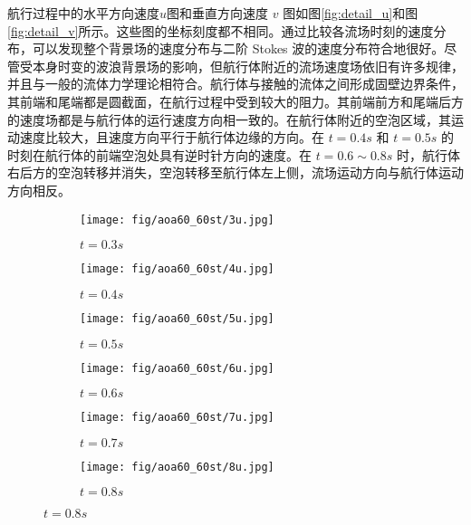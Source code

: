 航行过程中的水平方向速度$u$图和垂直方向速度 $v$ 图如图\ref{fig:detail_u}和图\ref{fig:detail_v}所示。这些图的坐标刻度都不相同。通过比较各流场时刻的速度分布，可以发现整个背景场的速度分布与二阶 Stokes 波的速度分布符合地很好。尽管受本身时变的波浪背景场的影响，但航行体附近的流场速度场依旧有许多规律，并且与一般的流体力学理论相符合。航行体与接触的流体之间形成固壁边界条件，其前端和尾端都是圆截面，在航行过程中受到较大的阻力。其前端前方和尾端后方的速度场都是与航行体的运行速度方向相一致的。在航行体附近的空泡区域，其运动速度比较大，且速度方向平行于航行体边缘的方向。在 $t = 0.4s$ 和 $t = 0.5s$ 的时刻在航行体的前端空泡处具有逆时针方向的速度。在 $t = 0.6 \sim 0.8 s$ 时，航行体右后方的空泡转移并消失，空泡转移至航行体左上侧，流场运动方向与航行体运动方向相反。 


\begin{figure}[!htp]
  \centering

  \begin{subfigure}{0.25\textwidth}
    \centering
    \texttt{[image: fig/aoa60\_60st/3u.jpg]}
    \caption{$t = 0.3s$}
  \end{subfigure}
  \hspace{1cm}
  \begin{subfigure}{0.25\textwidth}
    \centering
    \texttt{[image: fig/aoa60\_60st/4u.jpg]}
    \caption{$t = 0.4s$}
  \end{subfigure}
  \hspace{1cm}
  \begin{subfigure}{0.25\textwidth}
    \centering
    \texttt{[image: fig/aoa60\_60st/5u.jpg]}
    \caption{$t = 0.5s$}
  \end{subfigure}

  \quad

  \begin{subfigure}{0.25\textwidth}
    \centering
    \texttt{[image: fig/aoa60\_60st/6u.jpg]}
    \caption{$t = 0.6s$}
  \end{subfigure}
  \hspace{1cm}
  \begin{subfigure}{0.25\textwidth}
    \centering
    \texttt{[image: fig/aoa60\_60st/7u.jpg]}
    \caption{$t = 0.7s$}
  \end{subfigure}
  \hspace{1cm}
  \begin{subfigure}{0.25\textwidth}
    \centering
    \texttt{[image: fig/aoa60\_60st/8u.jpg]}
    \caption{$t = 0.8s$}
  \end{subfigure}


\end{figure}
